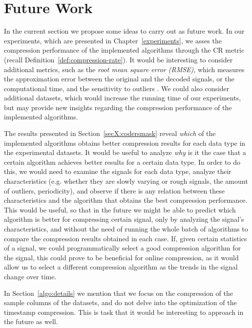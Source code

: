 
\section{Future Work}
\label{secX:future}


In the current section we propose some ideas to carry out as future work. In our experiments, which are presented in Chapter~\ref{experiments}, we asses the compression performance of the implemented algorithms through the CR metric (recall Definition~\ref{def:compression-rate}). It would be interesting to consider additional metrics, such as the \textit{root mean square error (RMSE)}, which measures the approximation error between the original and the decoded signals, or the computational time, and the sensitivity to outliers \cite{AnEva2013}. We could also consider additional datasets, which would increase the running time of our experiments, but may provide new insights regarding the compression performance of the implemented algorithms.


The results presented in Section~\ref{secX:codersmask} reveal \textit{which} of the implemented algorithms obtains better compression results for each data type in the experimental datasets. It would be useful to analyze \textit{why} is it the case that a certain algorithm achieves better results for a certain data type. In order to do this, we would need to examine the signals for each data type, analyze their characteristics (e.g. whether they are slowly varying or rough signals, the amount of outliers, periodicity), and observe if there is any relation between these characteristics and the algorithm that obtains the best compression performance. This would be useful, so that in the future we might be able to predict which algorithm is better for compressing certain signal, only by analyzing the signal's characteristics, and without the need of running the whole batch of algorithms to compare the compression results obtained in each case. If, given certain statistics of a signal, we could programmatically select a good compression algorithm for the signal, this could prove to be beneficial for online compression, as it would allow us to select a different compression algorithm as the trends in the signal change over time.


In Section~\ref{algo:details} we mention that we focus on the compression of the sample columns of the datasets, and do not delve into the optimization of the timestamp compression. This is task that it would be interesting to approach in the future as well.



